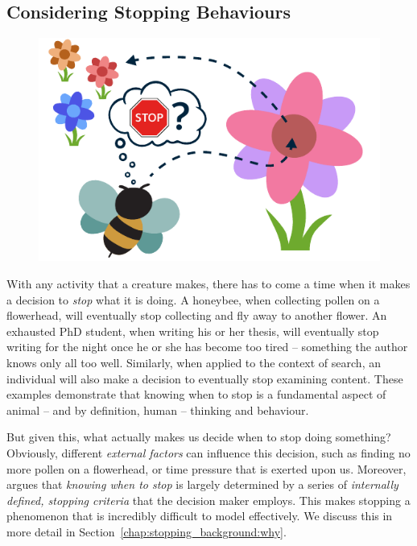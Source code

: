 \subsection{Considering Stopping Behaviours}\label{sec:intro:stopping}
\begin{figure}
    \begin{center}
    \vspace*{-10mm}
    \includegraphics[width=1\textwidth]{figures/ch1-bee.pdf}
    \end{center}
    \vspace*{-4mm}
    \label{fig:bee}
\end{figure}

With any activity that a creature makes, there has to come a time when it makes a decision to \emph{stop} what it is doing. A honeybee, when collecting pollen on a flowerhead, will eventually stop collecting and fly away to another flower. An exhausted PhD student, when writing his or her thesis, will eventually stop writing for the night once he or she has become too tired -- something the author knows only all too well. Similarly, when applied to the context of search, an individual will also make a decision to eventually stop examining content. These examples demonstrate that knowing when to stop is a fundamental aspect of animal -- and by definition, human -- thinking and behaviour.

But given this, what actually makes us decide when to stop doing something? Obviously, different \emph{external factors} can influence this decision, such as finding no more pollen on a flowerhead, or time pressure that is exerted upon us. Moreover,~\cite{nickles1995judgment} argues that \emph{knowing when to stop} is largely determined by a series of \emph{internally defined, stopping criteria} that the decision maker employs. This makes stopping a phenomenon that is incredibly difficult to model effectively. We discuss this in more detail in Section~\ref{chap:stopping_background:why}.

